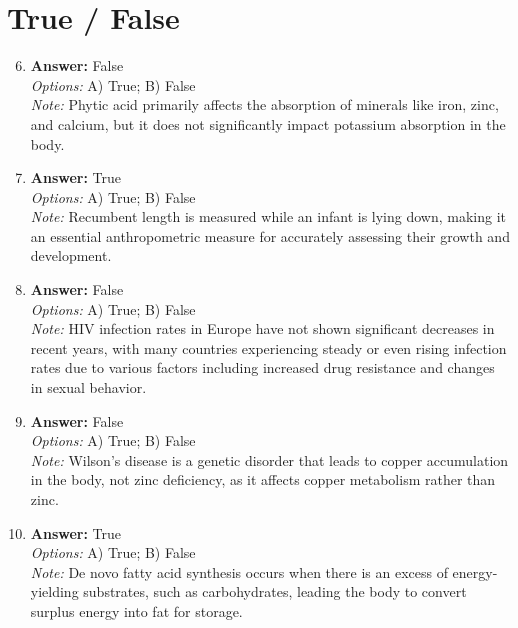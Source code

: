 \documentclass[12pt]{article}
\begin{document}
\section*{True / False}
\begin{enumerate}[label=\arabic*.]
\setcounter{enumi}{5}
\item \textbf{Answer:} False
\\ \textit{Options:} A) True; B) False
\\ \textit{Note:} Phytic acid primarily affects the absorption of minerals like iron, zinc, and calcium, but it does not significantly impact potassium absorption in the body.
\item \textbf{Answer:} True
\\ \textit{Options:} A) True; B) False
\\ \textit{Note:} Recumbent length is measured while an infant is lying down, making it an essential anthropometric measure for accurately assessing their growth and development.
\item \textbf{Answer:} False
\\ \textit{Options:} A) True; B) False
\\ \textit{Note:} HIV infection rates in Europe have not shown significant decreases in recent years, with many countries experiencing steady or even rising infection rates due to various factors including increased drug resistance and changes in sexual behavior.
\item \textbf{Answer:} False
\\ \textit{Options:} A) True; B) False
\\ \textit{Note:} Wilson's disease is a genetic disorder that leads to copper accumulation in the body, not zinc deficiency, as it affects copper metabolism rather than zinc.
\item \textbf{Answer:} True
\\ \textit{Options:} A) True; B) False
\\ \textit{Note:} De novo fatty acid synthesis occurs when there is an excess of energy-yielding substrates, such as carbohydrates, leading the body to convert surplus energy into fat for storage.
\end{enumerate}
\end{document}
